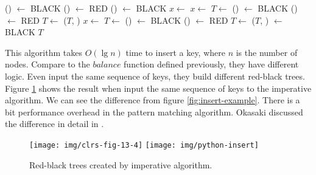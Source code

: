 \documentclass[b5paper]{article}
\begin{document}
\begin{algorithmic}[1]
      \State {}() $\gets$ BLACK
      \State {}() $\gets$ RED
      \State {}() $\gets$ BLACK
      \State $x \gets$ 
    \Else
          \State $x \gets$ 
          \State $T \gets$ 
        \EndIf
        \State {}() $\gets$ BLACK
        \State {}() $\gets$ RED
        \State $T \gets$ ($T$, )
      \Else
          \State $x \gets$ 
          \State $T \gets$ 
        \EndIf
        \State {}() $\gets$ BLACK
        \State {}() $\gets$ RED
        \State $T \gets$ ($T$, )
      \EndIf
    \EndIf
  \EndWhile
  \State {} $\gets$ BLACK
  \State \Return $T$
\EndFunction
\end{algorithmic}

This algorithm takes $O(\lg n)$ time to insert a key, where $n$ is the number of nodes. Compare to the $balance$ function defined previously, they have different logic. Even input the same sequence of keys, they build different red-black trees. Figure \ref{fig:imperative-insert} shows the result when input the same sequence of keys to the imperative algorithm. We can see the difference from figure \ref{fig:insert-example}. There is a bit performance overhead in the pattern matching algorithm. Okasaki discussed the difference in detail in \cite{okasaki}.

\begin{figure}[htbp]
   \centering
   \texttt{[image: img/clrs-fig-13-4]}
   \texttt{[image: img/python-insert]}
   \caption{Red-black trees created by imperative algorithm.}
   \label{fig:imperative-insert}
\end{figure}
\end{document}
